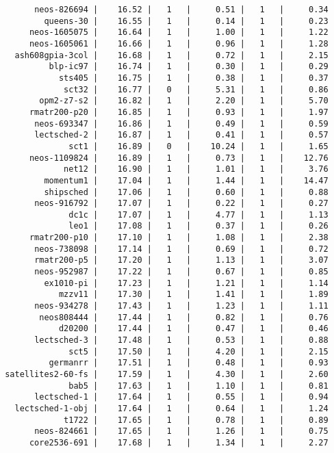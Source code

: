 \begin{lstlisting}
       neos-826694 |    16.52 |   1   |     0.51 |   1   |     0.34
         queens-30 |    16.55 |   1   |     0.14 |   1   |     0.23
      neos-1605075 |    16.64 |   1   |     1.00 |   1   |     1.22
      neos-1605061 |    16.66 |   1   |     0.96 |   1   |     1.28
   ash608gpia-3col |    16.68 |   1   |     0.72 |   1   |     2.15
          blp-ic97 |    16.74 |   1   |     0.30 |   1   |     0.29
            sts405 |    16.75 |   1   |     0.38 |   1   |     0.37
             sct32 |    16.77 |   0   |     5.31 |   1   |     0.86
        opm2-z7-s2 |    16.82 |   1   |     2.20 |   1   |     5.70
      rmatr200-p20 |    16.85 |   1   |     0.93 |   1   |     1.97
       neos-693347 |    16.86 |   1   |     0.49 |   1   |     0.59
       lectsched-2 |    16.87 |   1   |     0.41 |   1   |     0.57
              sct1 |    16.89 |   0   |    10.24 |   1   |     1.65
      neos-1109824 |    16.89 |   1   |     0.73 |   1   |    12.76
             net12 |    16.90 |   1   |     1.01 |   1   |     3.76
         momentum1 |    17.04 |   1   |     1.44 |   1   |    14.47
         shipsched |    17.06 |   1   |     0.60 |   1   |     0.88
       neos-916792 |    17.07 |   1   |     0.22 |   1   |     0.27
              dc1c |    17.07 |   1   |     4.77 |   1   |     1.13
              leo1 |    17.08 |   1   |     0.37 |   1   |     0.26
      rmatr200-p10 |    17.10 |   1   |     1.08 |   1   |     2.38
       neos-738098 |    17.14 |   1   |     0.69 |   1   |     0.72
       rmatr200-p5 |    17.20 |   1   |     1.13 |   1   |     3.07
       neos-952987 |    17.22 |   1   |     0.67 |   1   |     0.85
         ex1010-pi |    17.23 |   1   |     1.21 |   1   |     1.14
            mzzv11 |    17.30 |   1   |     1.41 |   1   |     1.89
       neos-934278 |    17.43 |   1   |     1.23 |   1   |     1.11
        neos808444 |    17.44 |   1   |     0.82 |   1   |     0.76
            d20200 |    17.44 |   1   |     0.47 |   1   |     0.46
       lectsched-3 |    17.48 |   1   |     0.53 |   1   |     0.88
              sct5 |    17.50 |   1   |     4.20 |   1   |     2.15
          germanrr |    17.51 |   1   |     0.48 |   1   |     0.93
 satellites2-60-fs |    17.59 |   1   |     4.30 |   1   |     2.60
              bab5 |    17.63 |   1   |     1.10 |   1   |     0.81
       lectsched-1 |    17.64 |   1   |     0.55 |   1   |     0.94
   lectsched-1-obj |    17.64 |   1   |     0.64 |   1   |     1.24
             t1722 |    17.65 |   1   |     0.78 |   1   |     0.89
       neos-824661 |    17.65 |   1   |     1.26 |   1   |     0.75
      core2536-691 |    17.68 |   1   |     1.34 |   1   |     2.27

\end{lstlisting}

